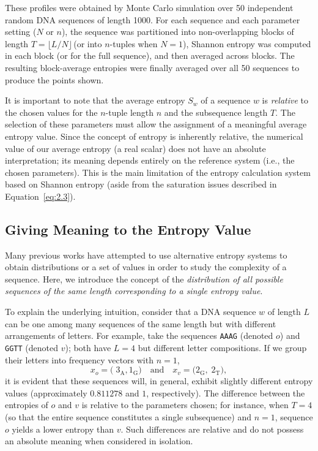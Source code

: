 \documentclass{article}
\theoremstyle{remark}
\begin{document}
These profiles were obtained by Monte Carlo simulation over 50 independent random DNA sequences of length 1000.  For each sequence and each parameter setting (\(N\) or \(n\)), the sequence was partitioned into non-overlapping blocks of length \(T=\lfloor L/N\rfloor\)\,(or into \(n\)-tuples when \(N=1\)), Shannon entropy was computed in each block (or for the full sequence), and then averaged across blocks.  The resulting block-average entropies were finally averaged over all 50 sequences to produce the points shown.  







It is important to note that the average entropy \(S_w\) of a sequence \(w\) is \emph{relative} to the chosen values for the \(n\)-tuple length \(n\) and the subsequence length \(T\). The selection of these parameters must allow the assignment of a meaningful average entropy value. Since the concept of entropy is inherently relative, the numerical value of our average entropy (a real scalar) does not have an absolute interpretation; its meaning depends entirely on the reference system (i.e., the chosen parameters). This is the main limitation of the entropy calculation system based on Shannon entropy (aside from the saturation issues described in Equation~\eqref{eq:2.3}). 

\subsection{Giving Meaning to the Entropy Value}

Many previous works have attempted to use alternative entropy systems to obtain distributions or a set of values in order to study the complexity of a sequence\cite{ref25,ref26,ref27}. Here, we introduce the concept of the \emph{distribution of all possible sequences of the same length corresponding to a single entropy value}.

To explain the underlying intuition, consider that a DNA sequence \(w\) of length \(L\) can be one among many sequences of the same length but with different arrangements of letters. For example, take the sequences \texttt{AAAG} (denoted \(o\)) and \texttt{GGTT} (denoted \(v\)); both have \(L=4\) but different letter compositions. If we group their letters into frequency vectors with \(n=1\),
\begin{equation}
x_o = \bigl(\; 3_\mathrm{A},1_\mathrm{G}\bigr) \quad\text{and}\quad
x_v = \bigl(2_\mathrm{G},\; 2_\mathrm{T}\bigr),
\end{equation}
it is evident that these sequences will, in general, exhibit slightly different entropy values (approximately \(0.811278\) and \(1\), respectively). The difference between the entropies of \(o\) and \(v\) is relative to the parameters chosen; for instance, when \(T=4\) (so that the entire sequence constitutes a single subsequence) and \(n=1\), sequence \(o\) yields a lower entropy than \(v\). Such differences are relative and do not possess an absolute meaning when considered in isolation.
\end{document}
